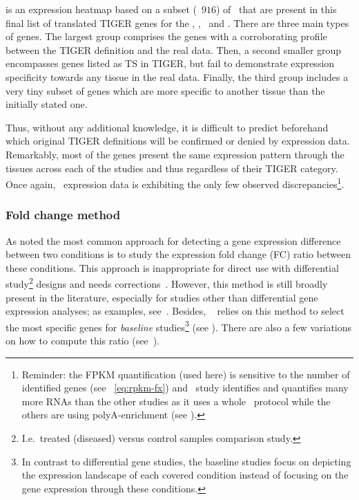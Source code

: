 is an expression heatmap based on
a subset (\ie\ $916$)  of \pcgs\
that are present in this final list of translated \gls{TIGER} genes
for the  \heart, \kidney, \liver\ and \testis.
There are three main types of genes.
The largest group comprises the genes with a corroborating profile
between the \gls{TIGER} definition and the real data.
Then, a second smaller group encompasses genes
listed as \gls{TS} in \gls{TIGER},
but fail to demonstrate expression specificity
towards any tissue in the real data.
Finally, the third group includes a very tiny subset of genes which
are more specific to another tissue than the initially stated one.\mybr\

Thus, without any additional knowledge,
it is difficult to predict beforehand which original \gls{TIGER} definitions
will be confirmed or denied by expression data.
Remarkably, most of the genes present the same expression pattern
through the tissues across each of the studies
and thus regardless of their \gls{TIGER} category.
Once again, \castle\ expression data is exhibiting
the only few observed discrepancies\footnote{Reminder:
the \gls{FPKM} quantification (used here) is sensitive
to the number of identified genes (see ~\vref{eq:rpkm-fx})
and \castle\ study identifies and quantifies many more \glspl{RNA} than the
other studies as it uses a whole \RNA\ protocol
while the others are using polyA-enrichment (see ).}.\mybr\

\subsubsection{Fold change method}\label{subsub:TisSpeGeneMethodPerso}
As \citet{DESeq2} noted the most common approach for detecting
a gene expression difference between two conditions is
to study the expression fold change (FC) ratio between these conditions.
This approach is inappropriate for direct use
with differential study\footnote{I.e.\ treated (diseased)
versus control samples comparison study.}
designs and
needs corrections~.
However, this method is still broadly present in the literature,
especially for studies other than differential gene expression analyses;
as examples, see~\citet{Uhlen2015,Zhu2016-xo,Yu2015-uh}.
Besides, \egxa\  relies on this method to select
the most specific genes for \emph{baseline} studies\footnote{In
contrast to differential gene studies,
the baseline studies focus on
depicting the expression landscape of each covered condition
instead of focusing on the gene expression through these conditions.}
(see \Cref{fig:gxaEx}).
There are also a few variations
on how to compute this ratio (see~\citet{Zhu2016-xo,Uhlen2015}).\mybr\


